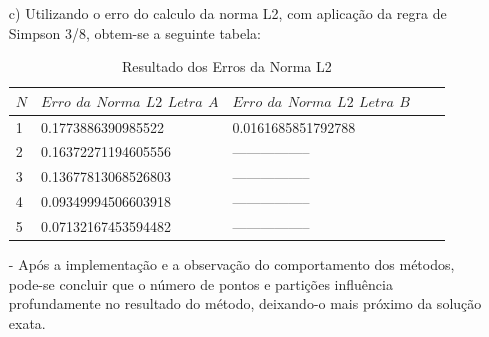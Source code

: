 \documentclass{article}
\begin{document}
\begin{itemize}
\begin{itemize}
\item[c)] Utilizando o erro do calculo da norma L2, com aplicação da regra de Simpson 3/8, obtem-se a seguinte tabela:

\begin{table}[h]
\centering
  \begin{tabular}{|l|l|l|ll}
   $N$ & $Erro$ $da$ $Norma$ $L2$ $Letra$ $A$ & $Erro$ $da$ $Norma$ $L2$ $Letra$ $B$ \\
    \hline
    1 &   0.1773886390985522 & 0.0161685851792788 \\
    2 &   0.16372271194605556 & ----------------- \\
    3 &   0.13677813068526803 & ----------------- \\
    4 &   0.09349994506603918 & ----------------- \\
    5 &   0.07132167453594482 & ----------------- \\
    \hline
  \end{tabular}
  \caption{Resultado dos Erros da Norma L2}
\end{table}

\item[-] Após a implementação e a observação do comportamento dos métodos, pode-se concluir que o número de pontos e partições influência profundamente no resultado do método, deixando-o mais próximo da solução exata.

\end{itemize}

\end{itemize}
\end{document}
